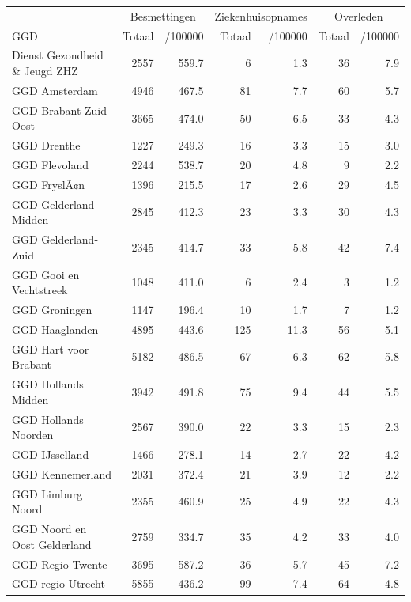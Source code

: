 \documentclass[
  english,
  man,floatsintext]{apa6}
\begin{document}
\begin{table}[H]
\centering\begingroup\fontsize{10}{12}\selectfont

\begin{threeparttable}
\begin{tabular}{lrrrrrr}
\toprule
\multicolumn{1}{c}{ } & \multicolumn{2}{c}{Besmettingen} & \multicolumn{2}{c}{Ziekenhuisopnames} & \multicolumn{2}{c}{Overleden} \\
\cmidrule(l{3pt}r{3pt}){2-3} \cmidrule(l{3pt}r{3pt}){4-5} \cmidrule(l{3pt}r{3pt}){6-7}
GGD & Totaal & /100000 & Totaal & /100000 & Totaal & /100000\\
\midrule
Dienst Gezondheid \& Jeugd ZHZ & 2557 & 559.7 & 6 & 1.3 & 36 & 7.9\\
GGD Amsterdam & 4946 & 467.5 & 81 & 7.7 & 60 & 5.7\\
GGD Brabant Zuid-Oost & 3665 & 474.0 & 50 & 6.5 & 33 & 4.3\\
GGD Drenthe & 1227 & 249.3 & 16 & 3.3 & 15 & 3.0\\
GGD Flevoland & 2244 & 538.7 & 20 & 4.8 & 9 & 2.2\\
GGD FryslÃ¢n & 1396 & 215.5 & 17 & 2.6 & 29 & 4.5\\
GGD Gelderland-Midden & 2845 & 412.3 & 23 & 3.3 & 30 & 4.3\\
GGD Gelderland-Zuid & 2345 & 414.7 & 33 & 5.8 & 42 & 7.4\\
GGD Gooi en Vechtstreek & 1048 & 411.0 & 6 & 2.4 & 3 & 1.2\\
GGD Groningen & 1147 & 196.4 & 10 & 1.7 & 7 & 1.2\\
GGD Haaglanden & 4895 & 443.6 & 125 & 11.3 & 56 & 5.1\\
GGD Hart voor Brabant & 5182 & 486.5 & 67 & 6.3 & 62 & 5.8\\
GGD Hollands Midden & 3942 & 491.8 & 75 & 9.4 & 44 & 5.5\\
GGD Hollands Noorden & 2567 & 390.0 & 22 & 3.3 & 15 & 2.3\\
GGD IJsselland & 1466 & 278.1 & 14 & 2.7 & 22 & 4.2\\
GGD Kennemerland & 2031 & 372.4 & 21 & 3.9 & 12 & 2.2\\
GGD Limburg Noord & 2355 & 460.9 & 25 & 4.9 & 22 & 4.3\\
GGD Noord en Oost Gelderland & 2759 & 334.7 & 35 & 4.2 & 33 & 4.0\\
GGD Regio Twente & 3695 & 587.2 & 36 & 5.7 & 45 & 7.2\\
GGD regio Utrecht & 5855 & 436.2 & 99 & 7.4 & 64 & 4.8\\

\end{tabular}
\end{threeparttable}
\end{table}
\end{document}
